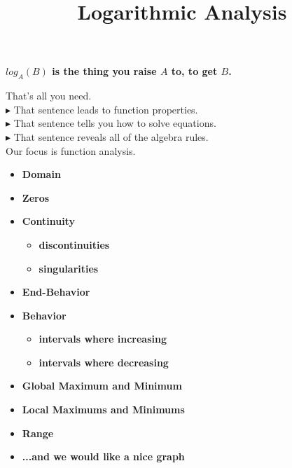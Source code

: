 \documentclass{ximera}
\title{Logarithmic Analysis}
\begin{document}
\begin{abstract}
\end{abstract}
\maketitle





\begin{center}
\textbf{\textcolor{red!80!black}{$log_A(B)$ is the thing you raise $A$ to, to get $B$.}}
\end{center}


That's all you need. \\

\textbf{\textcolor{red!90!darkgray}{$\blacktriangleright$}} That sentence leads to function properties. \\

\textbf{\textcolor{red!90!darkgray}{$\blacktriangleright$}} That sentence tells you how to solve equations. \\

\textbf{\textcolor{red!90!darkgray}{$\blacktriangleright$}} That sentence reveals all of the algebra rules. \\





Our focus is function analysis.





\begin{itemize}
     \item \textbf{\textcolor{red!80!black}{Domain}} 
     \item \textbf{\textcolor{red!80!black}{Zeros}} 
     \item \textbf{\textcolor{red!80!black}{Continuity}} 
\begin{itemize}
     \item \textbf{\textcolor{purple!85!blue}{discontinuities}} 
     \item \textbf{\textcolor{purple!85!blue}{singularities}} 
\end{itemize}
     \item \textbf{\textcolor{red!80!black}{End-Behavior}} 
     \item \textbf{\textcolor{red!80!black}{Behavior}} 
\begin{itemize}
     \item \textbf{\textcolor{purple!85!blue}{intervals where increasing}} 
     \item \textbf{\textcolor{purple!85!blue}{intervals where decreasing}} 
\end{itemize}
     \item \textbf{\textcolor{red!80!black}{Global Maximum and Minimum}} 
     \item \textbf{\textcolor{red!80!black}{Local Maximums and Minimums}} 
     \item \textbf{\textcolor{red!80!black}{Range}} 
     \item \textbf{\textcolor{blue!55!black}{...and we would like a nice graph}} 
\end{itemize}
\end{document}
